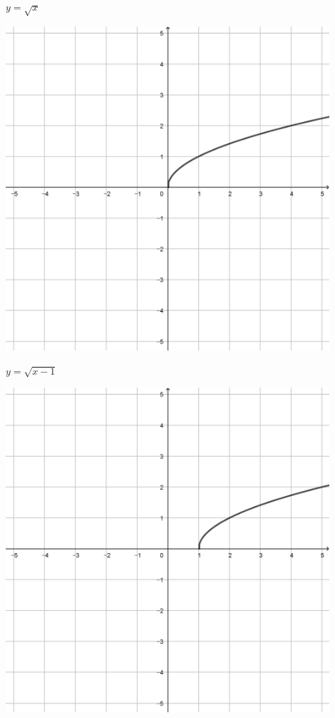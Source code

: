 \documentclass[a4paper]{oblivoir}
\begin{document}
\clearpage
\begin{minipage}{0.45\textwidth}\centering
\(y=\sqrt x\)
\par\bigskip\includegraphics[width=0.9\textwidth]{img/5_irrational_7}
\end{minipage}
\begin{minipage}{0.45\textwidth}\centering
\(y=\sqrt{x-1}\)
\par\bigskip\includegraphics[width=0.9\textwidth]{img/5_irrational_8}
\end{minipage}\bigskip\bigskip\par
\end{document}
